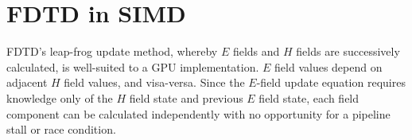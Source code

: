 \section{FDTD in SIMD}

FDTD's leap-frog update method, whereby $E$ fields and $H$ fields are successively calculated, is well-suited to a GPU implementation. $E$ field values depend on adjacent $H$ field values, and visa-versa. Since the $E$-field update equation requires knowledge only of the $H$ field state and previous $E$ field state, each field component can be calculated independently with no opportunity for a pipeline stall or race condition. 

